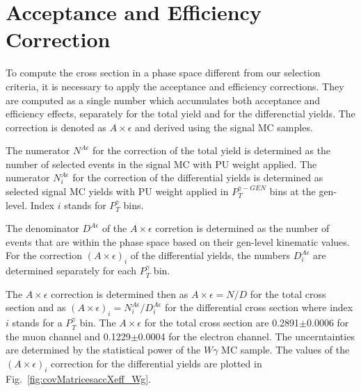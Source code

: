 \section{Acceptance and Efficiency Correction}
\label{sec:AccXEff}

To compute the cross section in a phase space different from our selection criteria, it is necessary to apply the acceptance and efficiency corrections. They are computed as a single number which accumulates both acceptance and efficiency effects, separately for the total yield and for the differenctial yields. The correction is denoted as $A \times \epsilon$ and derived using the signal MC samples.  

The numerator $N^{A\epsilon}$ for the correction of the total yield is determined as the number of selected events in the signal MC with PU weight applied. The numerator $N^{A\epsilon}_i$ for the correction of the differential yields is determined as selected signal MC yields with PU weight applied in $P_T^{\gamma-GEN}$ bins at the gen-level. Index $i$ stands for $P_T^{\gamma}$ bins.

The denominator $D^{A\epsilon}$ of the $A \times \epsilon$ corretion is determined as the number of events that are within the phase space based on their gen-level kinematic values. For the correction $(A \times \epsilon)_i$ of the differential yields, the numbers $D^{A\epsilon}_{i}$ are determined separately for each $P_T^\gamma$ bin.  

The $A \times \epsilon$ correction is determined then as $A \times \epsilon = N/D$ for the total cross section and as $(A \times \epsilon)_i = N^{A\epsilon}_i/{D^{A\epsilon}_i}$ for the differential cross section where index $i$ stands for a $P_T^{\gamma}$ bin. The $A \times \epsilon$ for the total cross section are 0.2891$\pm$0.0006 for the muon channel and 0.1229$\pm$0.0004 for the electron channel. The uncerntainties are determined by the statistical power of the $W\gamma$ MC sample. The values of the $(A \times \epsilon)_i$ correction for the differential yields are plotted in Fig.~\ref{fig:covMatricesaccXeff_Wg}.


